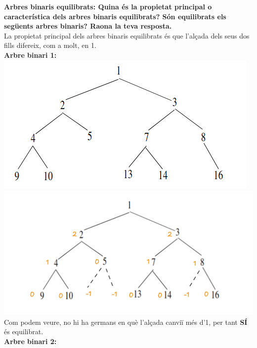 \documentclass[11pt]{article}
\begin{document}
    \textbf{Arbres binaris equilibrats:
    Quina és la propietat principal o característica dels arbres binaris equilibrats?
    Són equilibrats els següents arbres binaris?
    Raona la teva resposta. }\\

    La propietat principal dels arbres binaris equilibrats és que l'alçada dels seus dos fills difereix, com a molt, en 1.\\

    \textbf{ Arbre binari 1:}\\

    \includegraphics[scale=0.45]{imgs/a1} \includegraphics[scale=0.25]{imgs/a1eq}\\

    Com podem veure, no hi ha germans en què l'alçada canviï més d'1, per tant \textbf{SÍ} és equilibrat.\\

    \textbf{ Arbre binari 2:}\\
\end{document}
